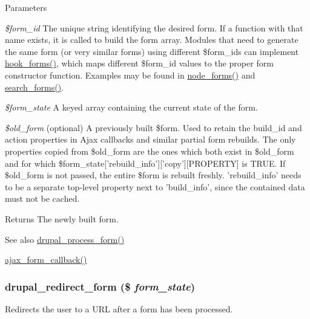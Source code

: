 \begin{DoxyParams}{Parameters}
\item[{\em \$form\_\-id}]The unique string identifying the desired form. If a function with that name exists, it is called to build the form array. Modules that need to generate the same form (or very similar forms) using different \$form\_\-ids can implement \hyperlink{group__hooks_gaa764fee74b85797f75c0c923cad628d5}{hook\_\-forms()}, which maps different \$form\_\-id values to the proper form constructor function. Examples may be found in \hyperlink{node_8module_aeb7774b7406a9dcba3c7f587a520df31}{node\_\-forms()} and \hyperlink{search_8module_a3396c4111908648bd2d0ddff911449fa}{search\_\-forms()}. \item[{\em \$form\_\-state}]A keyed array containing the current state of the form. \item[{\em \$old\_\-form}](optional) A previously built \$form. Used to retain the build\_\-id and action properties in Ajax callbacks and similar partial form rebuilds. The only properties copied from \$old\_\-form are the ones which both exist in \$old\_\-form and for which \$form\_\-state\mbox{[}'rebuild\_\-info'\mbox{]}\mbox{[}'copy'\mbox{]}\mbox{[}PROPERTY\mbox{]} is TRUE. If \$old\_\-form is not passed, the entire \$form is rebuilt freshly. 'rebuild\_\-info' needs to be a separate top-\/level property next to 'build\_\-info', since the contained data must not be cached.\end{DoxyParams}
\begin{DoxyReturn}{Returns}
The newly built form.
\end{DoxyReturn}
\begin{DoxySeeAlso}{See also}
\hyperlink{group__form__api_ga61186f5c43533761544a778918818fd2}{drupal\_\-process\_\-form()} 

\hyperlink{group__ajax_gabe2739824006df057d291f6be49759ab}{ajax\_\-form\_\-callback()} 
\end{DoxySeeAlso}
\hypertarget{group__form__api_ga552fc91207f10c473d36bf3f9889506c}{
\subsubsection[{drupal\_\-redirect\_\-form}]{\setlength{\rightskip}{0pt plus 5cm}drupal\_\-redirect\_\-form (\$ {\em form\_\-state})}}
\label{group__form__api_ga552fc91207f10c473d36bf3f9889506c}
Redirects the user to a URL after a form has been processed.

